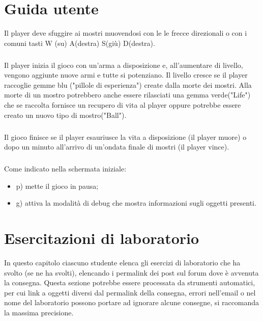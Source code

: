 \documentclass[a4paper,12pt]{report}
\begin{document}
\appendix
\chapter{Guida utente}

Il player deve sfuggire ai mostri muovendosi con le le frecce direzionali o con i comuni tasti W (su) A(destra) S(giù) D(destra).
\paragraph{}
Il player inizia il gioco con un'arma a disposizione e, all'aumentare di livello, vengono aggiunte nuove armi e tutte si potenziano.
%
Il livello cresce se il player raccoglie gemme blu ("pillole di esperienza") create dalla morte dei mostri.
Alla morte di un mostro potrebbero anche essere rilasciati una gemma verde("Life") che se raccolta fornisce un recupero di vita al player oppure potrebbe essere creato un nuovo tipo di mostro("Ball").
\paragraph{}
Il gioco finisce se il player esauriusce la vita a disposizione (il player muore) o dopo un minuto all'arrivo di un'ondata finale di mostri (il player vince).
\paragraph{}
Come indicato nella schermata iniziale:
\begin{itemize}
\item p) mette il gioco in pausa;
\item g) attiva la modalità di debug che mostra informazioni sugli oggetti presenti.
\end{itemize}


\chapter{Esercitazioni di laboratorio}

In questo capitolo ciascuno studente elenca gli esercizi di laboratorio che ha svolto
(se ne ha svolti),
elencando i permalink dei post sul forum dove è avvenuta la consegna.
%
Questa sezione potrebbe essere processata da strumenti automatici,
per cui link a oggetti diversi dal permalink della consegna,
errori nell'email o nel nome del laboratorio possono portare ad ignorare alcune consegne,
si raccomanda la massima precisione.
\end{document}
